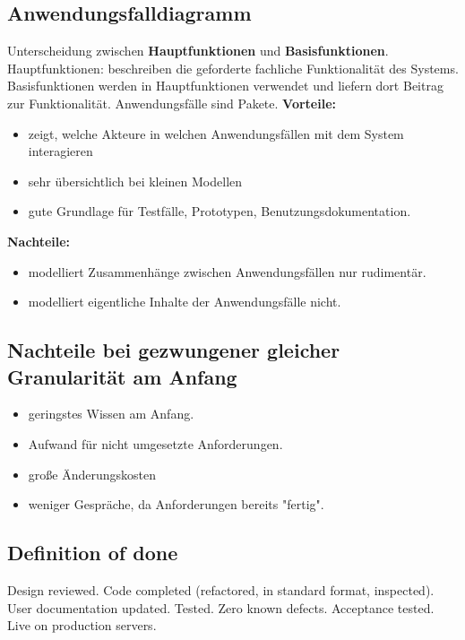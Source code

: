 \documentclass{book}
\begin{document}
    \subsection {\textbf{Anwendungsfalldiagramm}}
    Unterscheidung zwischen \textbf{Hauptfunktionen} und \textbf{Basisfunktionen}.
    Hauptfunktionen: beschreiben die geforderte fachliche Funktionalität des Systems.
    Basisfunktionen werden in Hauptfunktionen verwendet und liefern dort Beitrag zur Funktionalität.
    Anwendungsfälle sind Pakete.
    \textbf{Vorteile:}
    \begin{itemize}
        \item zeigt, welche Akteure in welchen Anwendungsfällen mit dem System interagieren
        \item sehr übersichtlich bei kleinen Modellen
        \item gute Grundlage für Testfälle, Prototypen, Benutzungsdokumentation.
    \end{itemize}
    \textbf{Nachteile:}
    \begin{itemize}
        \item modelliert Zusammenhänge zwischen Anwendungsfällen nur rudimentär.
        \item modelliert eigentliche Inhalte der Anwendungsfälle nicht.
    \end{itemize}
    \subsection{Nachteile bei gezwungener gleicher Granularität am Anfang}
    \begin{itemize}
        \item geringstes Wissen am Anfang.
        \item Aufwand für nicht umgesetzte Anforderungen.
        \item große Änderungskosten
        \item weniger Gespräche, da Anforderungen bereits "fertig".
    \end{itemize}
    \subsection{Definition of done}
    Design reviewed.
    Code completed (refactored, in standard format, inspected).
    User documentation updated.
    Tested.
    Zero known defects.
    Acceptance tested.
    Live on production servers.
\end{document}
